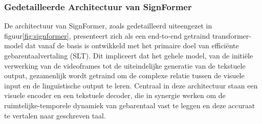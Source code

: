 \subsubsection{Gedetailleerde Architectuur van SignFormer}

De architectuur van SignFormer, zoals gedetailleerd uiteengezet in figuur\ref{fig:signformer}, presenteert zich als een end-to-end getraind transformer-model dat vanaf de basis is ontwikkeld met het primaire doel van efficiënte gebarentaalvertaling (SLT). 
Dit impliceert dat het gehele model, van de initiële verwerking van de videoframes tot de uiteindelijke generatie van de tekstuele output, gezamenlijk wordt getraind om de complexe relatie tussen de visuele input en de linguïstische output te leren. 
Centraal in deze architectuur staan een visuele encoder en een tekstuele decoder, die in synergie werken om de ruimtelijke-temporele dynamiek van gebarentaal vast te leggen en deze accuraat te vertalen naar geschreven taal.


